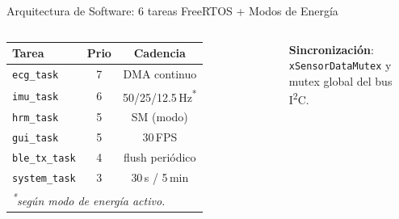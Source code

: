 \documentclass[aspectratio=169, 10pt]{beamer}
\begin{document}
\begin{frame}{Arquitectura de Software: 6 tareas FreeRTOS + Modos de Energ\'ia}
    \begin{columns}[T]
        \scriptsize
        \begin{tabular}{l c c}
            \toprule
            \textbf{Tarea} & \textbf{Prio} & \textbf{Cadencia} \\
            \midrule
            \texttt{ecg\_task}     & 7 & DMA continuo \\
            \texttt{imu\_task}     & 6 & 50/25/12.5\,Hz\textsuperscript{*}\\
            \texttt{hrm\_task}     & 5 & SM (modo) \\
            \texttt{gui\_task}     & 5 & 30\,FPS \\
            \texttt{ble\_tx\_task} & 4 & flush peri\'odico \\
            \texttt{system\_task}  & 3 & 30\,s / 5\,min \\
            \bottomrule
            \multicolumn{3}{l}{\scriptsize\textit{\textsuperscript{*}seg\'un modo de energ\'ia activo.}} \\
        \end{tabular}
        \vspace{0.2cm}
        
        \textbf{Sincronización}: \texttt{xSensorDataMutex} y\\ mutex global del bus I\textsuperscript{2}C.


\end{columns}
\end{frame}
\end{document}
